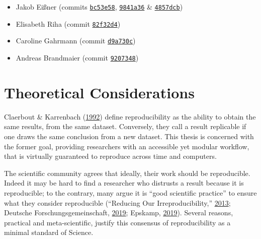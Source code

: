 \documentclass[12pt,a4paper,twoside]{article}
\providecommand{\tightlist}{%
  \setlength{\itemsep}{0pt}\setlength{\parskip}{0pt}}
\begin{document}
\begin{itemize}
\tightlist
\item
  Jakob Eißner (commits \href{https://github.com/aaronpeikert/repro-thesis/commit/bc53e58cf1861b4dbc4447853ad7f3895dd805ea}{\texttt{bc53e58}}, \href{https://github.com/aaronpeikert/repro-thesis/commit/9841a3695b9bc607b95e06e3d30b45116c6681ab}{\texttt{9841a36}} \& \href{https://github.com/aaronpeikert/repro-thesis/commit/4857dcb8536136efa63bbe5efb2da6ae6fc10681}{\texttt{4857dcb}})
\item
  Elisabeth Riha (commit \href{https://github.com/aaronpeikert/repro-thesis/commit/82f32d4d15dd3014dc0cf847166e0b023ea11a8a}{\texttt{82f32d4}})
\item
  Caroline Gahrmann (commit \href{https://github.com/aaronpeikert/repro-thesis/commit/d9a730cb1bdcedef3312bc2be32ad81a3d2a45b9}{\texttt{d9a730c}})
\item
  Andreas Brandmaier (commit \href{https://github.com/aaronpeikert/repro-thesis/commit/9207348f06a56d58637ced8636ad1e0005eb3e14}{\texttt{9207348}})
\end{itemize}

\newpage\null\thispagestyle{empty}\newpage

\hypertarget{theoretical-considerations}{%
\section{Theoretical Considerations}\label{theoretical-considerations}}

Claerbout \& Karrenbach (\protect\hyperlink{ref-claerboutElectronicDocumentsGive1992}{1992}) define reproducibility as the ability to obtain the same results, from the same dataset.
Conversely, they call a result replicable if one draws the same conclusion from a new dataset.
This thesis is concerned with the former goal, providing researchers with an accessible yet modular workflow, that is virtually guaranteed to reproduce across time and computers.

The scientific community agrees that ideally, their work should be reproducible.
Indeed it may be hard to find a researcher who distrusts a result because it is reproducible; to the contrary, many argue it is ``good scientific practice'' to ensure what they consider reproducible (``Reducing Our Irreproducibility,'' \protect\hyperlink{ref-AnnouncementReducingOur2013}{2013}; Deutsche Forschungsgemeinschaft, \protect\hyperlink{ref-dfg2019}{2019}; Epskamp, \protect\hyperlink{ref-epskamp2019rep}{2019}).
Several reasons, practical and meta-scientific, justify this consensus of reproducibility as a minimal standard of Science.
\end{document}
